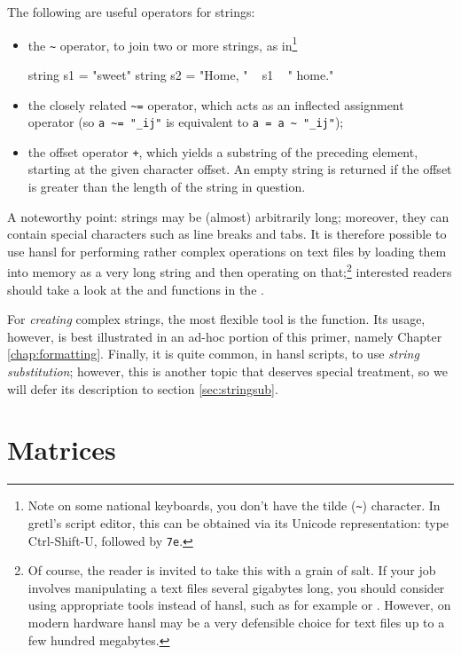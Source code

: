 The following are useful operators for strings:
\begin{itemize}
\item the \verb|~| operator, to join two or more strings, as
in\footnote{Note on some national keyboards, you don't have the tilde
  (\texttt{\~}) character. In gretl's script editor, this can be
  obtained via its Unicode representation: type Ctrl-Shift-U, followed
  by \texttt{7e}.}
  \begin{code}
    string s1 = "sweet"
    string s2 = "Home, " ~ s1 ~ " home."
  \end{code}
\item the closely related \verb|~=| operator, which acts as an
  inflected assignment operator (so \verb|a ~= "_ij"| is equivalent to
  \verb|a = a ~ "_ij"|);
\item the offset operator \texttt{+}, which yields a substring of the
  preceding element, starting at the given character offset.  An empty
  string is returned if the offset is greater than the length of the
  string in question.
\end{itemize}

A noteworthy point: strings may be (almost) arbitrarily long;
moreover, they can contain special characters such as line breaks and
tabs. It is therefore possible to use hansl for performing rather
complex operations on text files by loading them into memory as a very
long string and then operating on that;\footnote{Of course, the reader
  is invited to take this with a grain of salt. If your job involves
  manipulating a text files several gigabytes long, you should
  consider using appropriate tools instead of hansl, such as for
  example  or . However, on modern hardware
  hansl may be a very defensible choice for text files up to a few
  hundred megabytes.} interested readers should take a look at the
 and  functions in the \GCR.

For \emph{creating} complex strings, the most flexible tool is the
 function. Its usage, however, is best illustrated in an
ad-hoc portion of this primer, namely Chapter
\ref{chap:formatting}. Finally, it is quite common, in hansl scripts,
to use \emph{string substitution}; however, this is another topic that
deserves special treatment, so we will defer its description to
section \ref{sec:stringsub}.

\chapter{Matrices}


